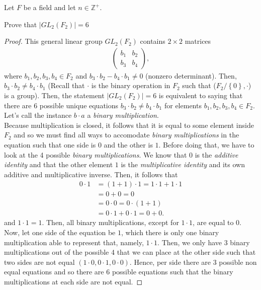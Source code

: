 \documentclass[12pt]{article}
\newcommand{\Z}{\mathbb{Z}}
\newenvironment{problem}[2][Problem]{\begin{trivlist} \item[\hskip \labelsep {\bfseries #1}\hskip \labelsep {\bfseries #2.}]}{\end{trivlist}}
\begin{document}
Let $F$ be a field and let $n\in \Z^{+}$.
\begin{problem}{1}
  Prove that $|GL_{2}(F_{2})|=6$
\begin{proof}
  This general linear group $GL_{2}(F_{2})$ contains $2\times 2$ matrices 
\begin{align*}
\begin{pmatrix}
  b_{1} & b_{2}\\
  b_{3} & b_{4}
\end{pmatrix},
\end{align*}
where $b_{1},b_{2},b_{3},b_{4}\in F_{2}$ and $b_{3}\cdot b_{2} - b_{4}\cdot b_{1} \neq  0$ (nonzero determinant). Then, $b_{3}\cdot b_{2} \neq b_{4}\cdot b_{1}$ (Recall that $\cdot$ is the binary operation in $F_{2}$ such that ($F_{2}/\left\{ 0 \right\},\cdot$) is a group). Then, the statement $|GL_{2}(F_{2})|=6$ is equivalent to saying that there are 6 possible unique equations $b_{3}\cdot b_{2} \neq b_{4}\cdot b_{1}$ for elements $b_{1},b_{2},b_{3},b_{4}\in F_{2}$. Let's call the instance $b\cdot a$ a \textit{binary multiplication}.\\
Because multiplication is closed, it follows that it is equal to some element inside $F_{2}$ and so we must find all ways to accomodate \textit{binary multiplications} in the equation such that one side is $0$ and the other is $1$. 
Before doing that, we have to look at the 4 possible \textit{binary multiplications}. We know that $0$ is the \textit{additive identity} and that the other element $1$ is the \textit{multiplicative identity} and its own additive and multiplicative inverse. Then, it follows that 
\begin{align*}
  0\cdot 1 &= (1+1)\cdot 1 = 1\cdot 1+ 1\cdot 1\\
 &= 0 + 0 = 0 \\
 &= 0\cdot 0 = 0\cdot (1+1) \\
 &= 0\cdot 1 + 0 \cdot 1 = 0 + 0.
\end{align*}
and $1\cdot 1 = 1$. Then, all binary multiplications, except for $1\cdot 1$, are equal to $0$. \\
Now, let one side of the equation be $1$, which there is only one binary multiplication able to represent that, namely, $1\cdot1$. Then, we only have 3 binary multiplications out of the possible 4 that we can place at the other side such that two sides are not equal $(1\cdot 0, 0\cdot 1, 0\cdot 0)$. Hence, per side there are 3 possible non equal equations and so there are 6 possible equations such that the binary multiplications at each side are not equal. 
\end{proof}
\end{problem}
\end{document}
